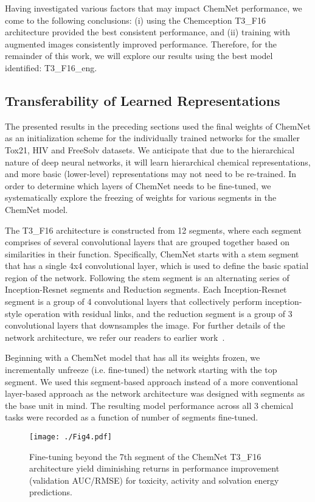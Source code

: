 \documentclass[sigconf]{acmart}
\begin{document}
Having investigated various factors that may impact ChemNet performance, we come to the following conclusions: (i) using the Chemception T3\_F16 architecture provided the best consistent performance, and (ii) training with augmented images consistently improved performance. Therefore, for the remainder of this work, we will explore our results using the best model identified: T3\_F16\_eng.

\subsection{Transferability of Learned Representations}
The presented results in the preceding sections used the final weights of ChemNet as an initialization scheme for the individually trained networks for the smaller Tox21, HIV and FreeSolv datasets. We anticipate that due to the hierarchical nature of deep neural networks, it will learn hierarchical chemical representations, and more basic (lower-level) representations may not need to be re-trained. In order to determine which layers of ChemNet needs to be fine-tuned, we systematically explore the freezing of weights for various segments in the ChemNet model.

The T3\_F16 architecture is constructed from 12 segments, where each segment comprises of several convolutional layers that are grouped together based on similarities in their function. Specifically, ChemNet starts with a stem segment that has a single 4x4 convolutional layer, which is used to define the basic spatial region of the network. Following the stem segment is an alternating series of Inception-Resnet segments and Reduction segments. Each Inception-Resnet segment is a group of 4 convolutional layers that collectively perform inception-style operation with residual links, and the reduction segment is a group of 3 convolutional layers that downsamples the image. For further details of the network architecture, we refer our readers to earlier work~\cite{goh2017c1}.

Beginning with a ChemNet model that has all its weights frozen, we incrementally unfreeze (i.e. fine-tuned) the network starting with the top segment. We used this segment-based approach instead of a more conventional layer-based approach as the network architecture was designed with segments as the base unit in mind. The resulting model performance across all 3 chemical tasks were recorded as a function of number of segments fine-tuned. 

\begin{figure}[!htbp]
\centering
\texttt{[image: ./Fig4.pdf]}
\caption{\small Fine-tuning beyond the 7th segment of the ChemNet T3\_F16 architecture yield diminishing returns in performance improvement (validation AUC/RMSE) for toxicity, activity and solvation energy predictions.}
\label{fig:4}
\end{figure}
\end{document}
